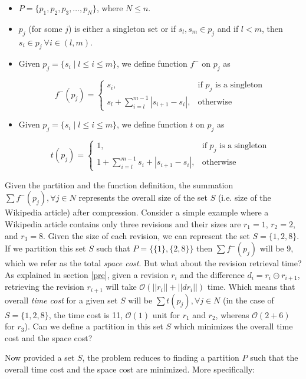 \documentclass[acmsmall]{acmart}
\begin{document}
\begin{itemize}
	\item $P = \{p_1, p_2, p_3, \ldots, p_N\}$, where $N \leq n$.
	\item $p_j$ (for some $j$) is either a singleton set or if $s_l, s_m \in p_j $ and if $l < m$, then $s_i \in p_j\ \forall i \in (l,m)$.
	\item Given $p_j = \{s_i \mid l\leq i\leq m\}$, we define function $f^-$ on $p_j$ as
  
$$f^-(p_j) =
\begin{cases}
s_i,  & \text{if $p_j$ is a singleton} \\
s_l + \sum_{i=l}^{m-1} |s_{i+1} - s_i|, & \text{otherwise}
\end{cases}$$

	\item Given $p_j = \{s_i \mid l\leq i\leq m\}$, we define function $t$ on $p_j$ as
  
$$t(p_j) =
\begin{cases}
1,  & \text{if $p_j$ is a singleton} \\
1 + \sum\limits_{i=l}^{m-1} s_i + |s_{i+1} - s_i|, & \text{otherwise}
\end{cases}$$
\end{itemize}

Given the partition and the function definition, the summation $\sum f^-(p_j), \forall j \in N$ represents the overall size of the set $S$ (i.e. size of the Wikipedia article) after compression. Consider a simple example where a Wikipedia article contains only three revisions and their sizes are $r_1 = 1$, $r_2 = 2$, and $r_3 = 8$. Given the size of each revision, we can represent the set $S = \{1, 2, 8\}$. If we partition this set $S$ such that $P = \{\{1\}, \{2, 8\}\}$ then $\sum f^-(p_j)$ will be 9, which we refer as the total \emph{space cost}. But what about the revision retrieval time? As explained in section \ref{pre}, given a revision $r_i$ and the difference $d_i = r_{i} \ominus r_{i+1}$, retrieving the revision $r_{i+1}$ will take $\mathcal{O}(||r_i||+||dr_i||)$ time. Which means that overall \emph{time cost} for a given set $S$ will be $\sum t(p_j), \forall j \in N$ (in the case of $S = \{1, 2, 8\}$, the time cost is 11, $\mathcal{O} (1)$ unit for $r_1$ and $r_2$, whereas $\mathcal{O} (2 + 6)$ for $r_3$). Can we define a partition in this set $S$ which minimizes the overall time cost and the space cost?

Now provided a set $S$, the problem reduces to finding a partition $P$ such that the overall time cost and the space cost are minimized. More specifically:
\end{document}
